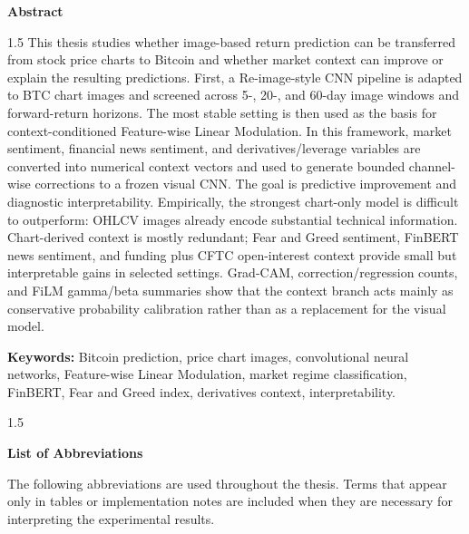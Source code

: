 \documentclass[14pt,a4paper]{extarticle}
\newcommand{\frontmattertitle}[1]{%
  \begin{center}
  {\normalfont\bfseries\fontsize{14pt}{16pt}\selectfont #1}
  \end{center}
  \vspace{0.35cm}
}
\begin{document}
\setcounter{page}{2}

\frontmattertitle{Abstract}
\begingroup
\setlength{\parindent}{0pt}
\begin{spacing}{1.5}
This thesis studies whether image-based return prediction can be transferred from stock price charts to Bitcoin and whether market context can improve or explain the resulting predictions. First, a Re-image-style CNN pipeline is adapted to BTC chart images and screened across 5-, 20-, and 60-day image windows and forward-return horizons. The most stable setting is then used as the basis for context-conditioned Feature-wise Linear Modulation. In this framework, market sentiment, financial news sentiment, and derivatives/leverage variables are converted into numerical context vectors and used to generate bounded channel-wise corrections to a frozen visual CNN. The goal is predictive improvement and diagnostic interpretability. Empirically, the strongest chart-only model is difficult to outperform: OHLCV images already encode substantial technical information. Chart-derived context is mostly redundant; Fear and Greed sentiment, FinBERT news sentiment, and funding plus CFTC open-interest context provide small but interpretable gains in selected settings. Grad-CAM, correction/regression counts, and FiLM gamma/beta summaries show that the context branch acts mainly as conservative probability calibration rather than as a replacement for the visual model.

\vspace{0.35cm}
\noindent\textbf{Keywords:} Bitcoin prediction, price chart images, convolutional neural networks, Feature-wise Linear Modulation, market regime classification, FinBERT, Fear and Greed index, derivatives context, interpretability.
\end{spacing}
\endgroup

\clearpage

\begingroup
\setlength{\parindent}{0pt}
\begin{spacing}{1.5}
\tableofcontents
\end{spacing}
\endgroup

\clearpage

\frontmattertitle{List of Abbreviations}
\noindent The following abbreviations are used throughout the thesis. Terms that appear only in tables or implementation notes are included when they are necessary for interpreting the experimental results.
\end{document}
